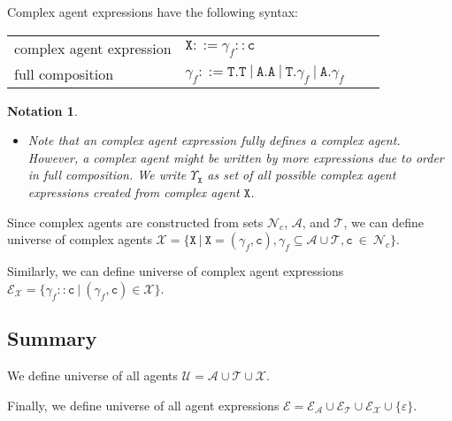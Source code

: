 \documentclass{entcs}
\renewcommand{\~}[0]{\texttildelow}
\newtheorem{notation}[thm]{Notation}
\begin{document}
Complex agent expressions have the following syntax:

\begin{center}
{\small
\hspace*{-1 cm}\begin{tabular}{ ll ll }
 complex agent expression & $\mathtt{X}::=\gamma_f::\mathtt{c}$\\
 full composition & $\gamma_f ::= \mathtt{T}.\mathtt{T}~|~\mathtt{A}.\mathtt{A}~|~\mathtt{T}.\gamma_{f}~|~\mathtt{A}.\gamma_{f}$
\end{tabular}
}
\end{center}

\begin{notation}
~
\begin{itemize}
\item Note that an complex agent expression fully defines a complex agent. However, a complex agent might be written by more expressions due to order in full composition. We write $\Upsilon_\mathtt{X}$ as set of all possible complex agent expressions created from complex agent $\mathtt{X}$.
\end{itemize}
\end{notation}

\begin{theorem}
Since complex agents are constructed from sets $\mathcal{N}_{c}$, $\mathcal{A}$, and $\mathcal{T}$, we can define universe of complex agents $\mathcal{X} = \{ \mathtt{X}~|~\mathtt{X} = (\gamma_f, \mathtt{c}), \gamma_f \subseteq \mathcal{A} \cup \mathcal{T},  \mathtt{c}~\in~\mathcal{N}_{c} \}$.

\noindent Similarly, we can define universe of complex agent expressions\\ $\mathcal{E}_\mathcal{X} = \{ \gamma_f::\mathtt{c} ~|~ (\gamma_f, \mathtt{c}) \in \mathcal{X} \}$.
\end{theorem}

\subsection{Summary}

\begin{definition}
We define universe of all agents $\mathcal{U} = \mathcal{A} \cup \mathcal{T} \cup \mathcal{X}.$

Finally, we define universe of all agent expressions $\mathcal{E} = \mathcal{E}_\mathcal{A} \cup \mathcal{E}_\mathcal{T} \cup \mathcal{E}_\mathcal{X} \cup \{\varepsilon\}$.
\end{definition}
\end{document}
